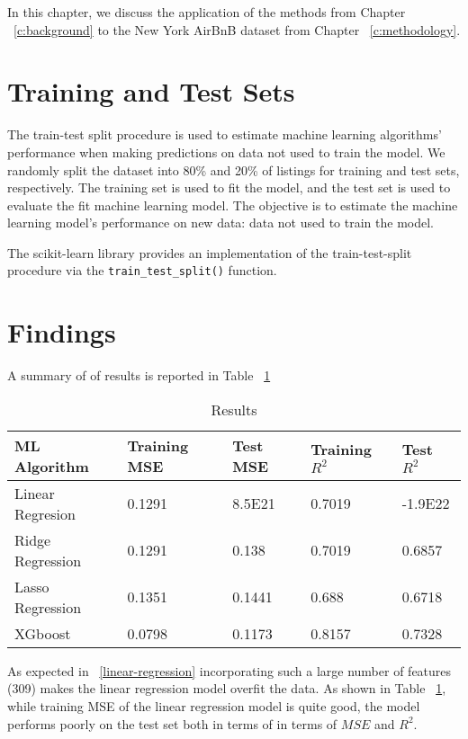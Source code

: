 In this chapter, we discuss the application of the methods from Chapter
~\ref{c:background} to the New York AirBnB dataset from Chapter
~\ref{c:methodology}.

\section{Training and Test Sets}
\label{sec:train_test_split}

The train-test split procedure is used to estimate machine learning algorithms'
performance when making predictions on data not used to train the model.  We
randomly split the dataset into 80\% and 20\% of listings for training and test
sets, respectively. The training set is used to fit the model, and the test
set is used to evaluate the fit machine learning model. The objective is to
estimate the machine learning model's performance on new data: data not used to
train the model.

The scikit-learn library provides an implementation of the train-test-split
procedure via the \texttt{train\_test\_split()} function.

\section{Findings}
\label{sec:findings}
A summary of of results is reported in Table ~\ref{tab:results}

\begin{table}[htpb]
  \centering
  \caption{Results}
  \label{tab:results}
  \begin{tabular}{lllll}
    \hline
    ML Algorithm & Training MSE & Test MSE & Training $R^2$ & Test $R^2$ \\
    \hline
    Linear Regresion & 0.1291 &  8.5E21 &  0.7019 & -1.9E22 \\
    Ridge Regression  & 0.1291 & 0.138 & 0.7019 &  0.6857 \\
    Lasso Regression & 0.1351 & 0.1441 & 0.688 & 0.6718 \\
    XGboost &  0.0798 & 0.1173 & 0.8157 &  0.7328 \\
  \end{tabular}
\end{table}


As expected in ~\ref{linear-regression} incorporating such a large number
of features (309) makes the linear regression model overfit the data. As
shown in Table ~\ref{tab:results}, while training MSE of the linear regression
model is quite good, the model performs poorly on the test set both in terms of
in terms of $MSE$ and $R^2$.

